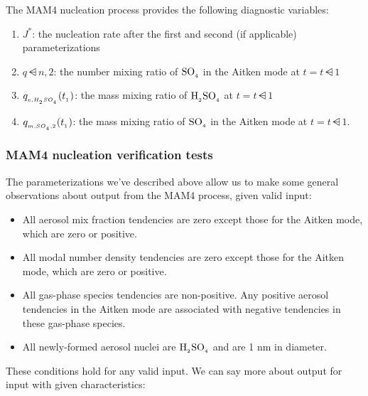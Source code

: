 The MAM4 nucleation process provides the following diagnostic variables:

\begin{enumerate}
  \item $J^*$: the nucleation rate after the first and second (if applicable)
        parameterizations
  \item $q\dsub{n,2}$: the number mixing ratio of $\rm SO_{_4}$ in the Aitken mode at
        $t = t\dsub1$
  \item $q_{_{v,H_{_2}SO_{_4}}} (t_{_{1}})$: the mass mixing ratio of $\rm H_{_2}SO_{_4}$ at
        $t = t\dsub1$
  \item $q_{_{m,SO_{_4},2}} (t_{_{1}})$: the mass mixing ratio of $\rm SO_{_4}$ in the
        Aitken mode at $t = t\dsub1$.
\end{enumerate}


\subsubsection{MAM4 nucleation verification tests} 

The parameterizations we've described above allow us to make some general
observations about output from the MAM4 process, given valid input:

\begin{itemize}
  \item All aerosol mix fraction tendencies are zero except those for the Aitken
        mode, which are zero or positive.
  \item All modal number density tendencies are zero except those for the Aitken
        mode, which are zero or positive.
  \item All gas-phase species tendencies are non-positive. Any positive
        aerosol tendencies in the Aitken mode are associated with negative
        tendencies in these gas-phase species.
  \item All newly-formed aerosol nuclei are $\rm H_{_2}SO_{_4}$ and are 1 nm in diameter.
\end{itemize}


These conditions hold for any valid input. We can say more about output for
input with given characteristics:


